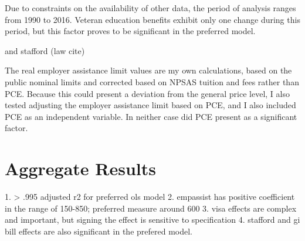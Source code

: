 \documentclass[review]{elsarticle}
\begin{document}
    Due to constraints on the availability of other data,
    the period of analysis ranges from 1990 to 2016.
    Veteran education benefits exhibit only one change during this period,
    but this factor proves to be significant in the preferred model.

    and stafford (law cite)

    The real employer assistance limit values are my own calculations,
    based on the public nominal limits and corrected based on NPSAS tuition and fees rather than PCE.
    Because this could present a deviation from the general price level, I also tested adjusting the employer assistance limit based on PCE,
    and I also included PCE as an independent variable. In neither case did PCE present as a significant factor.


    \section{Aggregate Results}

    1. > .995 adjusted r2 for preferred ols model
    2. empassist has positive coefficient in the range of 150-850; preferred measure around 600
    3. visa effects are complex and important, but signing the effect is sensitive to specification
    4. stafford and gi bill effects are also significant in the prefered model.

    
\end{document}
